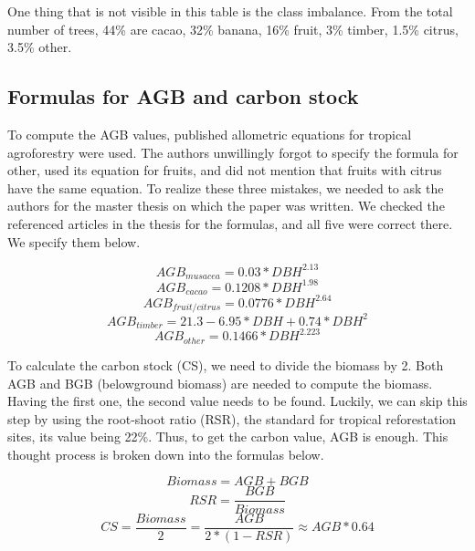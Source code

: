 \documentclass[10pt,twocolumn,letterpaper]{article}
\begin{document}
One thing that is not visible in this table is the class imbalance. From the total number of trees, 44\% are cacao, 32\% banana, 16\% fruit, 3\% timber, 1.5\% citrus, 3.5\% other.

\subsection{Formulas for AGB and carbon stock}\label{agb-cs-subsec}
To compute the AGB values, published allometric equations for tropical agroforestry were used. The authors unwillingly forgot to specify the formula for other, used its equation for fruits, and did not mention that fruits with citrus have the same equation. To realize these three mistakes, we needed to ask the authors for the master thesis on which the paper was written. We checked the referenced articles in the thesis for the formulas, and all five were correct there. We specify them below.

\begin{equation}
AGB_{musacea} = 0.03 * DBH ^ {2.13}
\end{equation}
\begin{equation}
AGB_{cacao} = 0.1208 * DBH ^ {1.98}
\end{equation}
\begin{equation}
AGB_{fruit/citrus} = 0.0776 * DBH ^ {2.64}
\end{equation}
\begin{equation}
AGB_{timber} = 21.3 - 6.95 * DBH + 0.74 * DBH ^ {2}
\end{equation}
\begin{equation}
AGB_{other} = 0.1466 * DBH ^ {2.223}
\end{equation}


To calculate the carbon stock (CS), we need to divide the biomass by 2. Both AGB and BGB (belowground biomass) are needed to compute the biomass. Having the first one, the second value needs to be found. Luckily, we can skip this step by using the root-shoot ratio (RSR), the standard for tropical reforestation sites, its value being 22\%. Thus, to get the carbon value, AGB is enough. This thought process is broken down into the formulas below.

\begin{equation}
Biomass = AGB + BGB
\end{equation}
\begin{equation}
RSR = \frac{BGB}{Biomass}
\end{equation}
\begin{equation}
CS = \frac{Biomass}{2} = \frac{AGB}{2 * (1 - RSR)} \approx AGB * 0.64
\end{equation}
\end{document}
